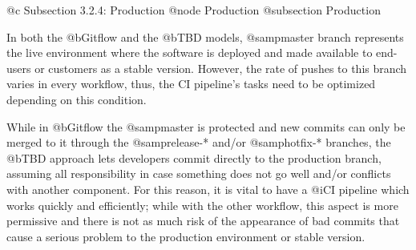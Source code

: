 @c Subsection 3.2.4: Production
@node Production
@subsection Production

In both the @b{Gitflow} and the @b{TBD} models, @samp{master} branch represents the live environment where the software is deployed and made available to end-users or customers as a stable version. However, the rate of pushes to this branch varies in every workflow, thus, the CI pipeline's tasks need to be optimized depending on this condition.

While in @b{Gitflow} the @samp{master} is protected and new commits can only be merged to it through the @samp{release-*} and/or @samp{hotfix-*} branches, the @b{TBD} approach lets developers commit directly to the production branch, assuming all responsibility in case something does not go well and/or conflicts with another component. For this reason, it is vital to have a @i{CI pipeline} which works quickly and efficiently; while with the other workflow, this aspect is more permissive and there is not as much risk of the appearance of bad commits that cause a serious problem to the production environment or stable version.
